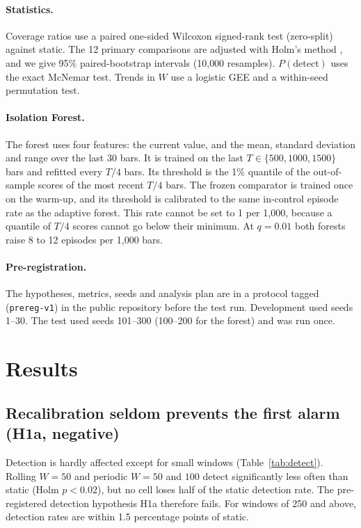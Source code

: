 \documentclass[11pt]{article}
\begin{document}
\paragraph{Statistics.} Coverage ratios use a paired one-sided Wilcoxon signed-rank test (zero-split) against static. The 12 primary comparisons are adjusted with Holm's method \cite{holm1979}, and we give 95\% paired-bootstrap intervals (10{,}000 resamples). $P(\text{detect})$ uses the exact McNemar test. Trends in $W$ use a logistic GEE and a within-seed permutation test.

\paragraph{Isolation Forest.} The forest \cite{liu2008iforest} uses four features: the current value, and the mean, standard deviation and range over the last 30 bars. It is trained on the last $T\in\{500,1000,1500\}$ bars and refitted every $T/4$ bars. Its threshold is the 1\% quantile of the out-of-sample scores of the most recent $T/4$ bars. The frozen comparator is trained once on the warm-up, and its threshold is calibrated to the same in-control episode rate as the adaptive forest. This rate cannot be set to 1 per 1{,}000, because a quantile of $T/4$ scores cannot go below their minimum. At $q=0.01$ both forests raise 8 to 12 episodes per 1{,}000 bars.

\paragraph{Pre-registration.} The hypotheses, metrics, seeds and analysis plan are in a protocol tagged (\texttt{prereg-v1}) in the public repository before the test run. Development used seeds 1--30. The test used seeds 101--300 (100--200 for the forest) and was run once.

\section{Results}

\subsection{Recalibration seldom prevents the first alarm (H1a, negative)}

Detection is hardly affected except for small windows (Table~\ref{tab:detect}). Rolling $W=50$ and periodic $W=50$ and $100$ detect significantly less often than static (Holm $p<0.02$), but no cell loses half of the static detection rate. The pre-registered detection hypothesis H1a therefore fails. For windows of 250 and above, detection rates are within 1.5 percentage points of static.
\end{document}
